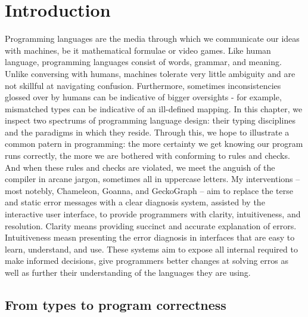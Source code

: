 
\chapter{Introduction}

\label{chap:introduction} 

\graphicspath{{Figures/Introduction}}

Programming languages are the media through which we communicate our ideas with machines, be it mathematical formulae or video games. Like human language, programming languages consist of words, grammar, and meaning. Unlike conversing with humans, machines tolerate very little ambiguity and are not skillful at navigating confusion. Furthermore, sometimes inconsistencies glossed over by humans can be indicative of bigger oversights - for example, mismatched types can be indicative of an ill-defined mapping. In this chapter, we inspect two spectrums of programming language design: their typing disciplines and the paradigms in which they reside. Through this, we hope to illustrate a common patern in programming: the more certainty we get knowing our program runs correctly, the more we are bothered with conforming to rules and checks. And when these rules and checks are violated, we meet the anguish of the compiler in arcane jargon, sometimes all in uppercase letters. My interventions -- most notebly, Chameleon, Goanna, and GeckoGraph -- aim to replace the terse and static error messages with a clear diagnosis system, assisted by the interactive user interface, to provide programmers with clarity, intuitiveness, and resolution. Clarity means providing succinct and accurate explanation of errors. Intuitiveness measn presenting the error diagnosis in interfaces that are easy to learn, understand, and use. These systems aim to  expose all internal required to make informed decisions, give programmers better changes at solving erros as well as further their understanding of the languages they are using.


\section{From types to program correctness}

